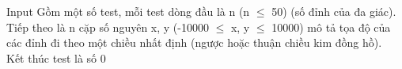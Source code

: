 Input
Gồm một số test, mỗi test dòng đầu là n (n  $\le$  50) (số đỉnh của đa giác).   
\\   Tiếp theo là n cặp số nguyên x, y (-10000  $\le$  x, y  $\le$  10000) mô tả tọa độ của các đỉnh đi theo một chiều nhất định (ngược hoặc thuận chiều kim đồng hồ).   
\\   Kết thúc test là số 0